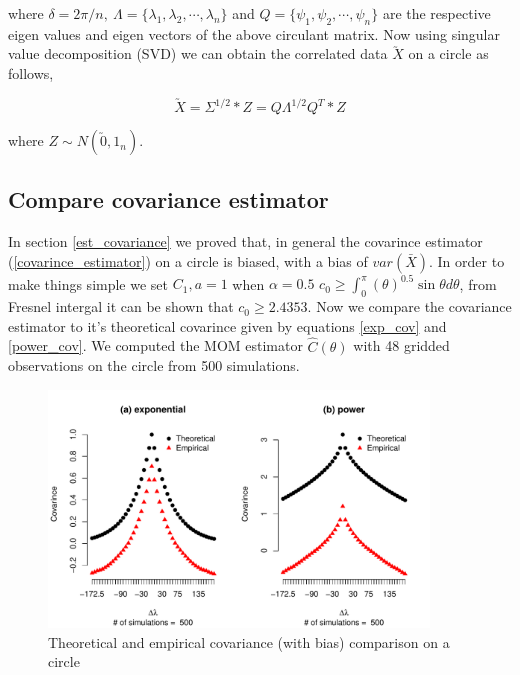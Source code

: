where $\delta = 2\pi/n,\ \Lambda=\{\lambda_1, \lambda_2,\cdots,\lambda_n\}$ and $Q=\{\psi_1, \psi_2,\cdots,\psi_n\}$ are the respective eigen values and eigen vectors of the above circulant matrix. Now using singular value decomposition (SVD) we can obtain the correlated data $\utilde{X}$ on a circle as follows,

\[
	\utilde{X} = \Sigma^{1/2}*Z = Q\Lambda^{1/2}Q^T*Z 
\]

where $Z\sim N(\utilde{0},1_{n})$.

\subsection{Compare covariance estimator} 


	      In section \ref{est_covariance} we proved that, in general the covarince estimator (\ref{covarince_estimator}) on a circle is biased, with a bias of $var(\bar{X})$. In order to make things simple we set $C_1, a = 1$ when $\alpha = 0.5$ $c_0 \ge \int_0^\pi(\theta)^{0.5} \sin \theta d \theta$, from Fresnel intergal it can be shown that $c_0 \ge 2.4353$. Now we compare the covariance estimator to it's theoretical covarince given by equations \ref{exp_cov} and \ref{power_cov}. We computed the MOM estimator $\hat{C}(\theta)$ with 48 gridded observations on the circle from 500 simulations.
	      	      
	      \begin{figure}[H]
	      	\label{covarince_circle}
	      	\centering
	       	\includegraphics[width=0.9\textwidth]{graphs/covarince_circle}
	      	\caption {Theoretical and empirical covariance (with bias) comparison on a circle}
	      \end{figure}


